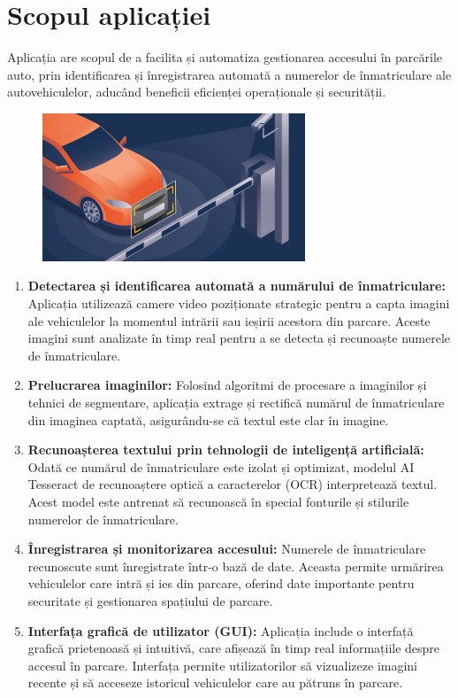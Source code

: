 \documentclass[a4paper,12pt]{report}
\begin{document}
\section*{Scopul aplicației}
Aplicația are scopul de a facilita și automatiza gestionarea accesului în parcările auto, prin identificarea și înregistrarea automată a numerelor de înmatriculare ale autovehiculelor, aducând beneficii eficienței operaționale și securității.

\begin{figure}[h]
    \centering
    \includegraphics[width=0.7\textwidth]{images/picture.jpg}
\end{figure}
\FloatBarrier

\begin{enumerate}[label=\Roman*.]
    \item \textbf{Detectarea și identificarea automată a numărului de înmatriculare:} Aplicația utilizează camere video poziționate strategic pentru a capta imagini ale vehiculelor la momentul intrării sau ieșirii acestora din parcare. Aceste imagini sunt analizate în timp real pentru a se detecta și recunoaște numerele de înmatriculare.

    \item \textbf{Prelucrarea imaginilor:} Folosind algoritmi de procesare a imaginilor și tehnici de segmentare, aplicația extrage și rectifică numărul de înmatriculare din imaginea captată, asigurându-se că textul este clar în imagine.

    \item \textbf{Recunoașterea textului prin tehnologii de inteligență artificială:} Odată ce numărul de înmatriculare este izolat și optimizat, modelul AI Tesseract de recunoaștere optică a caracterelor (OCR) interpretează textul. Acest model este antrenat să recunoască în special fonturile și stilurile numerelor de înmatriculare.

    \item \textbf{Înregistrarea și monitorizarea accesului:} Numerele de înmatriculare recunoscute sunt înregistrate într-o bază de date. Aceasta permite urmărirea vehiculelor care intră și ies din parcare, oferind date importante pentru securitate și gestionarea spațiului de parcare.

    \item \textbf{Interfața grafică de utilizator (GUI):} Aplicația include o interfață grafică prietenoasă și intuitivă, care afișează în timp real informațiile despre accesul în parcare. Interfața permite utilizatorilor să vizualizeze imagini recente și să acceseze istoricul vehiculelor care au pătruns în parcare.
\end{enumerate}
\end{document}
